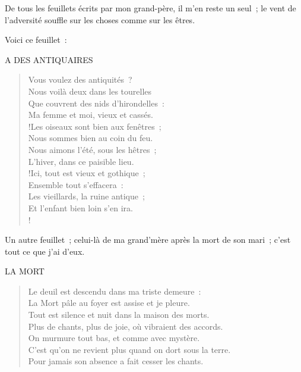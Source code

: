 \documentclass[french,twoside]{book} %
\newenvironment{quoteblock}%
  {\begin{quoting}}
  {\end{quoting}}
\newcommand\chaptercont{} %
\newenvironment{quotebar}{%
    \def\FrameCommand{{\color{rubric!10!}\vrule width 0.5em} \hspace{0.9em}}%
    \def\OuterFrameSep{\itemsep} %
    \MakeFramed {\advance\hsize-\width \FrameRestore}
  }%
  {%
    \endMakeFramed
  }
\renewenvironment{quoteblock}%
  {%
    \savenotes
    \setstretch{0.9}
    \normalfont
    \begin{quotebar}
  }
  {%
    \end{quotebar}
    \spewnotes
  }
\begin{document}
\chaptercont
\noindent De tous les feuillets écrits par mon grand-père, il m’en reste un seul ; le vent de l’adversité souffle sur les choses comme sur les êtres.\par
Voici ce feuillet :\par

\begin{quoteblock}
A DES ANTIQUAIRES\end{quoteblock}

\begin{verse}
Vous voulez des antiquités ?\\
Nous voilà deux dans les tourelles\\
Que couvrent des nids d’hirondelles :\\
Ma femme et moi, vieux et cassés.\\!Les oiseaux sont bien aux fenêtres ;\\
Nous sommes bien au coin du feu.\\
Nous aimons l’été, sous les hêtres ;\\
L’hiver, dans ce paisible lieu.\\!Ici, tout est vieux et gothique ;\\
Ensemble tout s’effacera :\\
Les vieillards, la ruine antique ;\\
Et l’enfant bien loin s’en ira.\\!
\end{verse}

\noindent Un autre feuillet ; celui-là de ma grand’mère  après la mort de son mari ; c’est tout ce que j’ai d’eux.\par

\begin{quoteblock}
LA MORT\end{quoteblock}

\begin{verse}
Le deuil est descendu dans ma triste demeure :\\
La Mort pâle au foyer est assise et je pleure.\\
Tout est silence et nuit dans la maison des morts.\\
Plus de chants, plus de joie, où vibraient des accords.\\
On murmure tout bas, et comme avec mystère.\\
C’est qu’on ne revient plus quand on dort sous la terre.\\
Pour jamais son absence a fait cesser les chants.\\
\end{verse}
\end{document}
